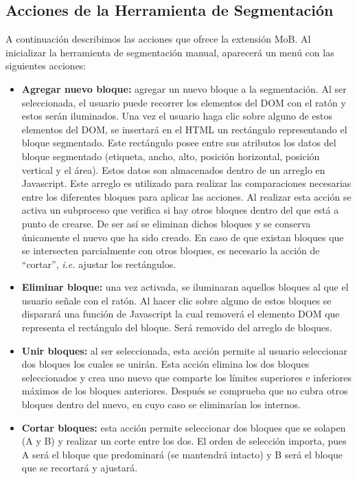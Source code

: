 \documentclass[10pt]{revecom}
\begin{document}
\subsection{Acciones de la Herramienta de Segmentación}
A continuación describimos las acciones que ofrece la extensión MoB. 
Al inicializar la herramienta de segmentación manual, aparecerá un menú con las siguientes acciones: 
\begin{itemize}
\item \textbf{Agregar nuevo bloque:} agregar un nuevo bloque a la segmentación. 
Al ser seleccionada, el usuario puede recorrer los elementos del DOM con el ratón y estos serán iluminados.
Una vez el usuario haga clic sobre alguno de estos elementos del DOM, se insertará en el HTML un rectángulo representando el bloque segmentado. 
Este rectángulo posee entre sus atributos los datos del bloque segmentado (etiqueta, ancho, alto, posición horizontal, posición vertical y el área). 
Estos datos son almacenados dentro de un arreglo en Javascript. Este arreglo es utilizado para realizar las comparaciones necesarias entre los diferentes bloques para aplicar las  acciones. 
Al realizar esta acción se activa un subproceso que verifica si hay otros bloques dentro del que está a punto de crearse. 
De ser así se eliminan dichos bloques y se conserva únicamente el nuevo que ha sido creado. 
En caso de que existan bloques que se intersecten parcialmente con otros bloques, es necesario la acción de ``cortar'', \emph{i.e.} ajustar los rectángulos.
\item \textbf{Eliminar bloque:} una vez activada, se iluminaran aquellos bloques al que el usuario señale con el ratón. 
Al hacer clic sobre alguno de estos bloques se disparará una función de Javascript la cual removerá el elemento DOM que representa el rectángulo del bloque. Será removido del arreglo de bloques.
\item \textbf{Unir bloques:} al ser seleccionada, esta acción permite al usuario seleccionar dos bloques los cuales se unirán. 
Esta acción elimina los dos bloques seleccionados y crea uno nuevo que comparte los límites superiores e inferiores máximos de los bloques anteriores. 
Después se comprueba que no cubra otros bloques dentro del nuevo, en cuyo caso se eliminarían los internos.
\item \textbf{Cortar bloques:} esta acción permite seleccionar dos bloques que se solapen (A y B) y realizar un corte entre los dos. El orden de selección importa, pues A será el bloque que predominará (se mantendrá intacto) y B será el bloque que se recortará y ajustará.

\end{itemize}
\end{document}
